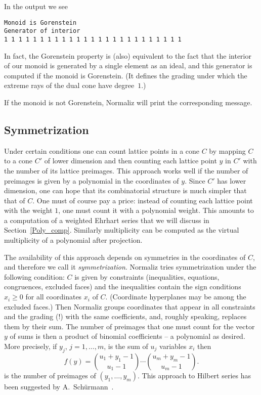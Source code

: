 In the output we see
\begin{Verbatim}
Monoid is Gorenstein 
Generator of interior
1 1 1 1 1 1 1 1 1 1 1 1 1 1 1 1 1 1 1 1 1 1 1 1 1 
\end{Verbatim}

In fact, the Gorenstein property is (also) equivalent to the fact that the interior of our monoid is generated by a single element as an ideal, and this generator is computed if the monoid is Gorenstein. (It defines the grading under which the extreme rays of the dual cone have degree~$1$.)

If the monoid is not Gorenstein, Normaliz will print the corresponding message.

\subsection{Symmetrization}\label{symmetrize}

Under certain conditions one can count lattice points in a cone $C$ by mapping $C$ to a cone $C'$ of lower dimension and then counting each lattice point $y$ in $C'$ with the number of its lattice preimages. This approach works well if the number of preimages is given by a polynomial in the coordinates of $y$. Since $C'$ has lower dimension, one can hope that its combinatorial structure is much simpler that that of $C$. One must of course pay a price: instead of counting each lattice point with the weight $1$, one must count it with a polynomial weight. This amounts to a computation of a weighted Ehrhart series that we will discuss in Section~\ref{Poly_comp}. Similarly multiplicity can be computed as the virtual multiplicity of a polynomial after projection.

The availability of this approach depends on symmetries in the coordinates of $C$, and therefore we call it \emph{symmetrization}. Normaliz tries symmetrization under the following condition: $C$ is given by constraints (inequalities, equations, congruences, excluded faces) and the inequalities contain the sign conditions $x_i\ge 0$ for all coordinates $x_i$ of $C$. (Coordinate hyperplanes may be among the excluded faces.) Then Normaliz groups coordinates that appear in all constraints and the grading (!) with the same coefficients, and, roughly speaking, replaces them by their sum. The number of preimages that one must count for the vector $y$ of sums is then a product of binomial coefficients -- a polynomial as desired. More precisely, if $y_j$, $j=1,\dots,m$, is the sum of $u_j$ variables $x_i$ then
$$
f(y)=\binom{u_1+y_1-1}{u_1-1}\cdots \binom{u_m+y_m-1}{u_m-1}.
$$
is the number of preimages of $(y_1,\dots,y_m)$. This approach to Hilbert series has been suggested by A.~Sch\"urmann~\cite{Sch}.

